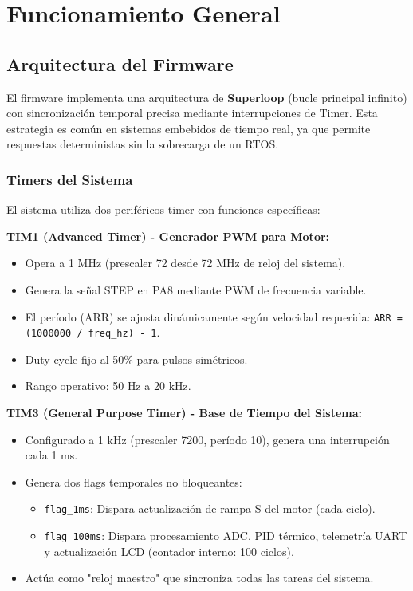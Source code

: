 \documentclass[12pt]{article}
\begin{document}
\section{Funcionamiento General}

\subsection{Arquitectura del Firmware}
El firmware implementa una arquitectura de \textbf{Superloop} (bucle principal infinito) con sincronización temporal precisa mediante interrupciones de Timer. Esta estrategia es común en sistemas embebidos de tiempo real, ya que permite respuestas deterministas sin la sobrecarga de un RTOS.

\subsubsection{Timers del Sistema}
El sistema utiliza dos periféricos timer con funciones específicas:

\textbf{TIM1 (Advanced Timer) - Generador PWM para Motor:}
\begin{itemize}
    \item Opera a 1 MHz (prescaler 72 desde 72 MHz de reloj del sistema).
    \item Genera la señal STEP en PA8 mediante PWM de frecuencia variable.
    \item El período (ARR) se ajusta dinámicamente según velocidad requerida: \texttt{ARR = (1000000 / freq\_hz) - 1}.
    \item Duty cycle fijo al 50\% para pulsos simétricos.
    \item Rango operativo: 50 Hz a 20 kHz.
\end{itemize}

\textbf{TIM3 (General Purpose Timer) - Base de Tiempo del Sistema:}
\begin{itemize}
    \item Configurado a 1 kHz (prescaler 7200, período 10), genera una interrupción cada 1 ms.
    \item Genera dos flags temporales no bloqueantes:
    \begin{itemize}
        \item \texttt{flag\_1ms}: Dispara actualización de rampa S del motor (cada ciclo).
        \item \texttt{flag\_100ms}: Dispara procesamiento ADC, PID térmico, telemetría UART y actualización LCD (contador interno: 100 ciclos).
    \end{itemize}
    \item Actúa como "reloj maestro" que sincroniza todas las tareas del sistema.
\end{itemize}
\end{document}
